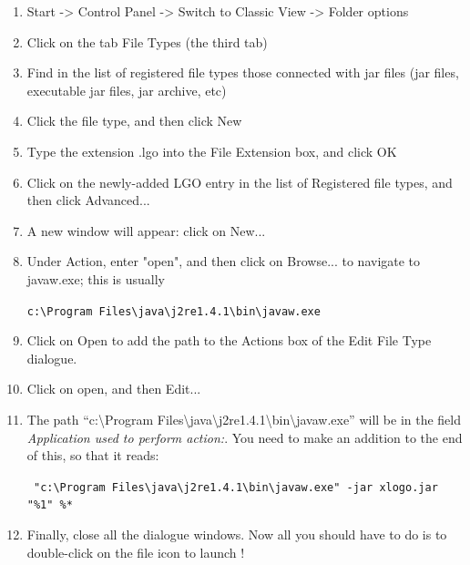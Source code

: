 \begin{enumerate}
\item Start -> Control Panel -> Switch to Classic View  -> Folder options
\item Click on the tab File Types (the third tab)
\item Find in the list of registered file types those connected with jar files (jar files, executable jar files, jar archive, etc)
\item Click the file type, and then click New
\item Type the extension .lgo into the File Extension box, and click OK
\item Click on the newly-added LGO entry in the list of Registered file types, and then click Advanced...
\item A new window will appear: click on New...
\item Under Action, enter "open", and then click on Browse... to navigate to javaw.exe; this is usually
\begin{center}
\texttt{c:\textbackslash{}Program Files\textbackslash{}java\textbackslash{}j2re1.4.1\textbackslash{}bin\textbackslash{}javaw.exe}
\end{center}
\item Click on Open to add the path to the Actions box of the Edit File Type dialogue.
\item Click on open, and then Edit...
\item The path {}``c:\textbackslash{}Program Files\textbackslash{}java\textbackslash{}j2re1.4.1\textbackslash{}bin\textbackslash{}javaw.exe'' will be in the field \textit{Application used to perform action:}.  You need to make an addition to the end of this, so that it reads:
\begin{center}
\texttt{ "c:\textbackslash{}Program Files\textbackslash{}java\textbackslash{}j2re1.4.1\textbackslash{}bin\textbackslash{}javaw.exe" -jar xlogo.jar "\%1" \%{*}}
\end{center}
\item Finally, close all the dialogue windows.  Now all you should have to do is to double-click on the file icon to launch \xlogo!
\end{enumerate}

